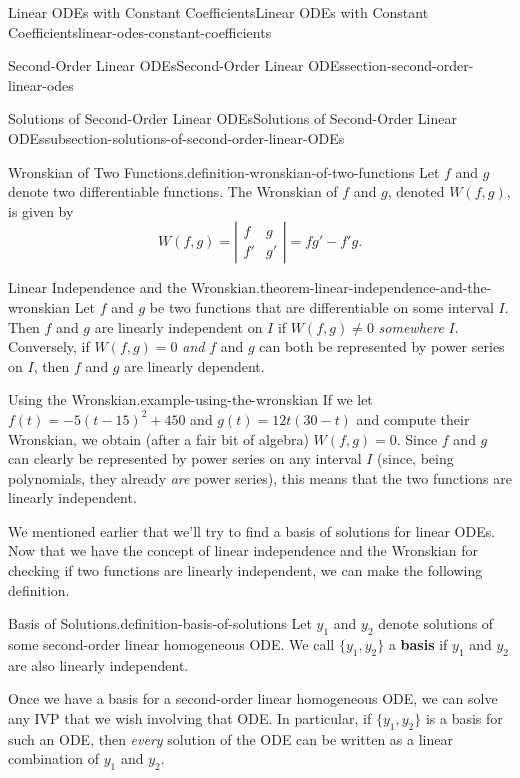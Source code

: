 \documentclass[oneside,10pt,]{book}
\newcommand{\terminology}[1]{\textbf{#1}}
\numberwithin{equation}{section}
\newcommand{\amp}{&}
\begin{document}
\begin{chapterptx}{Linear ODEs with Constant Coefficients}{}{Linear ODEs with Constant Coefficients}{}{}{linear-odes-constant-coefficients}
\begin{sectionptx}{Second-Order Linear ODEs}{}{Second-Order Linear ODEs}{}{}{section-second-order-linear-odes}
\begin{subsectionptx}{Solutions of Second-Order Linear ODEs}{}{Solutions of Second-Order Linear ODEs}{}{}{subsection-solutions-of-second-order-linear-ODEs}
\begin{definition}{Wronskian of Two Functions.}{definition-wronskian-of-two-functions}%
\hypertarget{p-169}{}%
Let \(f\) and \(g\) denote two differentiable functions. The Wronskian of \(f\) and \(g\), denoted \(W(f,g)\), is given by%
\begin{equation*}
W(f,g) = \left|\begin{matrix} f \amp g \\ f' \amp g' \end{matrix}\right| = fg' - f'g.
\end{equation*}
%
\end{definition}
\begin{theorem}{Linear Independence and the Wronskian.}{}{theorem-linear-independence-and-the-wronskian}%
\hypertarget{p-170}{}%
Let \(f\) and \(g\) be two functions that are differentiable on some interval \(I\). Then \(f\) and \(g\) are linearly independent on \(I\) if \(W(f,g) \neq 0\) \emph{somewhere} \(I\). Conversely, if \(W(f,g) = 0\) \emph{and} \(f\) and \(g\) can both be represented by power series on \(I\), then \(f\) and \(g\) are linearly dependent.%
\end{theorem}
\begin{example}{Using the Wronskian.}{example-using-the-wronskian}%
\hypertarget{p-171}{}%
If we let \(f(t) = -5(t-15)^{2} + 450\) and \(g(t) = 12t(30-t)\) and compute their Wronskian, we obtain (after a fair bit of algebra) \(W(f,g) = 0\). Since \(f\) and \(g\) can clearly be represented by power series on any interval \(I\) (since, being polynomials, they already \emph{are} power series), this means that the two functions are linearly independent.%
\end{example}
\hypertarget{p-172}{}%
We mentioned earlier that we'll try to find a basis of solutions for linear ODEs. Now that we have the concept of linear independence and the Wronskian for checking if two functions are linearly independent, we can make the following definition.%
\begin{definition}{Basis of Solutions.}{definition-basis-of-solutions}%
\hypertarget{p-173}{}%
Let \(y_{1}\) and \(y_{2}\) denote solutions of some second-order linear homogeneous ODE. We call \(\{y_{1},y_{2}\}\) a \terminology{basis} if \(y_{1}\) and \(y_{2}\) are also linearly independent.%
\end{definition}
\hypertarget{p-174}{}%
Once we have a basis for a second-order linear homogeneous ODE, we can solve any IVP that we wish involving that ODE. In particular, if \(\{y_{1},y_{2}\}\) is a basis for such an ODE, then \emph{every} solution of the ODE can be written as a linear combination of \(y_{1}\) and \(y_{2}\).%

\end{subsectionptx}
\end{sectionptx}
\end{chapterptx}
\end{document}
